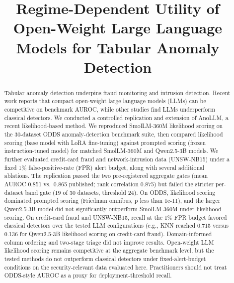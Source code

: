 \documentclass[conference]{IEEEtran}
\begin{document}
\title{Regime-Dependent Utility of Open-Weight Large Language Models for Tabular Anomaly Detection}

\author{
\and
{}
}

\maketitle

\begin{abstract}
Tabular anomaly detection underpins fraud monitoring and intrusion detection.
Recent work reports that compact open-weight large language models (LLMs) can be competitive on benchmark AUROC, while other studies find LLMs underperform classical detectors.
We conducted a controlled replication and extension of AnoLLM, a recent likelihood-based method.
We reproduced SmolLM-360M likelihood scoring on the 30-dataset ODDS anomaly-detection benchmark suite, then compared likelihood scoring (base model with LoRA fine-tuning) against prompted scoring (frozen instruction-tuned model) for matched SmolLM-360M and Qwen2.5-3B models.
We further evaluated credit-card fraud and network-intrusion data (UNSW-NB15) under a fixed 1\% false-positive-rate (FPR) alert budget, along with several additional ablations.
The replication passed the two pre-registered aggregate gates (mean AUROC 0.851 vs.\ 0.865 published; rank correlation 0.875) but failed the stricter per-dataset band gate (19 of 30 datasets, threshold 24).
On ODDS, likelihood scoring dominated prompted scoring (Friedman omnibus, p less than 1e-11), and the larger Qwen2.5-3B model did not significantly outperform SmolLM-360M under likelihood scoring.
On credit-card fraud and UNSW-NB15, recall at the 1\% FPR budget favored classical detectors over the tested LLM configurations (e.g., KNN reached 0.715 versus 0.136 for Qwen2.5-3B likelihood scoring on credit-card fraud).
Domain-informed column ordering and two-stage triage did not improve results.
Open-weight LLM likelihood scoring remains competitive at the aggregate benchmark level, but the tested methods do not outperform classical detectors under fixed-alert-budget conditions on the security-relevant data evaluated here.
Practitioners should not treat ODDS-style AUROC as a proxy for deployment-threshold recall.
\end{abstract}
\end{document}
